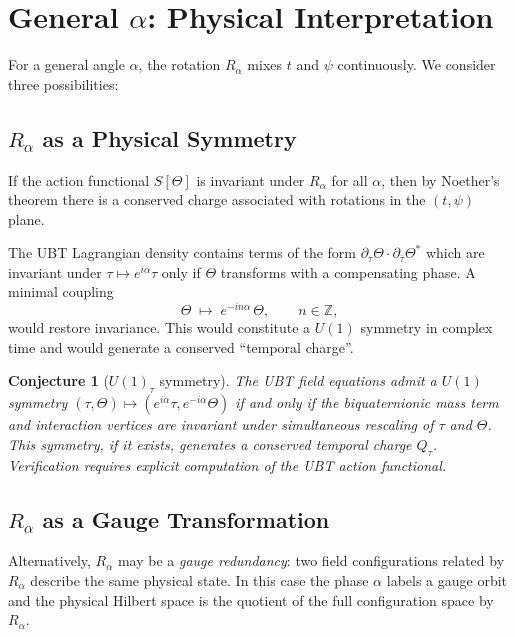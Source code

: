\documentclass[12pt]{article}
\newtheorem{conjecture}{Conjecture}
\begin{document}
\section{General $\alpha$: Physical Interpretation}
For a general angle $\alpha$, the rotation $R_\alpha$ mixes $t$ and $\psi$
continuously.  We consider three possibilities:

\subsection{$R_\alpha$ as a Physical Symmetry}
If the action functional $S[\Theta]$ is invariant under $R_\alpha$ for all
$\alpha$, then by Noether's theorem there is a conserved charge associated
with rotations in the $(t,\psi)$ plane.

The UBT Lagrangian density contains terms of the form
$\partial_\tau \Theta \cdot \partial_{\bar\tau} \Theta^*$ which are
invariant under $\tau \mapsto e^{i\alpha}\tau$ only if $\Theta$ transforms
with a compensating phase.  A minimal coupling
\begin{equation}
  \Theta \;\longmapsto\; e^{-i n\alpha}\,\Theta, \qquad n \in \mathbb{Z},
\end{equation}
would restore invariance.  This would constitute a $U(1)$ symmetry in
complex time and would generate a conserved ``temporal charge''.

\begin{conjecture}[$U(1)_\tau$ symmetry]
\label{conj:u1_tau}
The UBT field equations admit a $U(1)$ symmetry
$(\tau, \Theta) \mapsto (e^{i\alpha}\tau, e^{-i\alpha}\Theta)$
if and only if the biquaternionic mass term and interaction vertices are
invariant under simultaneous rescaling of $\tau$ and $\Theta$.  This
symmetry, if it exists, generates a conserved temporal charge $Q_\tau$.
Verification requires explicit computation of the UBT action functional.
\end{conjecture}

\subsection{$R_\alpha$ as a Gauge Transformation}
Alternatively, $R_\alpha$ may be a \emph{gauge redundancy}: two field
configurations related by $R_\alpha$ describe the same physical state.
In this case the phase $\alpha$ labels a gauge orbit and the physical
Hilbert space is the quotient of the full configuration space by
$R_\alpha$.
\end{document}
